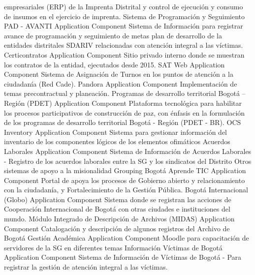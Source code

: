 \documentclass[
	a4paper, %
	12pt, %
]{include/CSSullivanBusinessReport}
\begin{document}
empresariales (ERP) de la Imprenta Distrital y control de ejecución y
consumo de insumos en el ejercicio de imprenta. \textbar{} \textbar{}
Sistema de Programación y Seguimiento PAD - AVANTI \textbar{}
Application Component \textbar{} Sistema de Información para registrar
avance de programación y seguimiento de metas plan de desarrollo de la
entidades distritales SDARIV relacionadas con atención integral a las
víctimas. \textbar{} \textbar{} Certicontratos \textbar{} Application
Component \textbar{} Sitio privado interno donde se muestran los
contratos de la entidad, ejecutados desde 2015. \textbar{} \textbar{}
SAT Web \textbar{} Application Component \textbar{} Sistema de
Asignación de Turnos en los puntos de atención a la ciudadanía (Red
Cade). \textbar{} \textbar{} Pandora \textbar{} Application Component
\textbar{} Implementación de temas precontractual y planeación.
\textbar{} \textbar{} Programas de desarrollo territorial Bogotá --
Región (PDET) \textbar{} Application Component \textbar{} Plataforma
tecnológica para habilitar los procesos participativos de construcción
de paz, con énfasis en la formulación de los programas de desarrollo
territorial Bogotá - Región (PDET - BR). \textbar{} \textbar{} OCS
Inventory \textbar{} Application Component \textbar{} Sistema para
gestionar información del inventario de los componentes lógicos de los
elementos ofimáticos \textbar{} \textbar{} Acuerdos Laborales \textbar{}
Application Component \textbar{} Sistema de Información de Acuerdos
Laborales - Registro de los acuerdos laborales entre la SG y los
sindicatos del Distrito \textbar{} \textbar{} Otros sistemas de apoyo a
la misionalidad \textbar{} Grouping \textbar{} \textbar{} \textbar{}
Bogotá Aprende TIC \textbar{} Application Component \textbar{} Portal de
apoya los procesos de Gobierno abierto y relacionamiento con la
ciudadanía, y Fortalecimiento de la Gestión Pública. \textbar{}
\textbar{} Bogotá Internacional (Globo) \textbar{} Application Component
\textbar{} Sistema donde se registran las acciones de Cooperación
Internacional de Bogotá con otras ciudades e instituciones del mundo.
\textbar{} \textbar{} Módulo Integrado de Descripción de Archivos
(MIDAS) \textbar{} Application Component \textbar{} Catalogación y
descripción de algunos registros del Archivo de Bogotá \textbar{}
\textbar{} Gestión Académica \textbar{} Application Component \textbar{}
Moodle para capacitación de servidores de la SG en diferentes temas
\textbar{} \textbar{} Información Víctimas de Bogotá \textbar{}
Application Component \textbar{} Sistema de Información de Víctimas de
Bogotá - Para registrar la gestión de atención integral a las víctimas.
\end{document}
